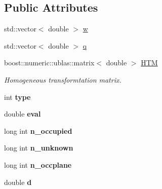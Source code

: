\subsection*{Public Attributes}
\begin{DoxyCompactItemize}
\item 
std\+::vector$<$ double $>$ \hyperlink{classViewStructure_a378f7e104ffc8fddd6f9033399900ef6}{w}
\item 
std\+::vector$<$ double $>$ \hyperlink{classViewStructure_a5c78495a797c42e810e808df7a5da7cb}{q}
\item 
boost\+::numeric\+::ublas\+::matrix$<$ double $>$ \hyperlink{classViewStructure_a8252f8da95421963152c504ade86aa2d}{H\+TM}\hypertarget{classViewStructure_a8252f8da95421963152c504ade86aa2d}{}\label{classViewStructure_a8252f8da95421963152c504ade86aa2d}

\begin{DoxyCompactList}\small\item\em Homogeneous transformtation matrix. \end{DoxyCompactList}\item 
int {\bfseries type}\hypertarget{classViewStructure_ab3cc96aefab06a43fb3d61be211cb932}{}\label{classViewStructure_ab3cc96aefab06a43fb3d61be211cb932}

\item 
double {\bfseries eval}\hypertarget{classViewStructure_a4e2c9f63553048233d407370e8e484b4}{}\label{classViewStructure_a4e2c9f63553048233d407370e8e484b4}

\item 
long int {\bfseries n\+\_\+occupied}\hypertarget{classViewStructure_a40996b9fb4a584407991fc118a44a318}{}\label{classViewStructure_a40996b9fb4a584407991fc118a44a318}

\item 
long int {\bfseries n\+\_\+unknown}\hypertarget{classViewStructure_a2dfd62d1a5854b273a27b006debc920e}{}\label{classViewStructure_a2dfd62d1a5854b273a27b006debc920e}

\item 
long int {\bfseries n\+\_\+occplane}\hypertarget{classViewStructure_acd99c19b17dee8872ea832d4ef36c116}{}\label{classViewStructure_acd99c19b17dee8872ea832d4ef36c116}

\item 
double {\bfseries d}\hypertarget{classViewStructure_af2302cdc43dcc8b83483201b208b7891}{}\label{classViewStructure_af2302cdc43dcc8b83483201b208b7891}

\end{DoxyCompactItemize}
